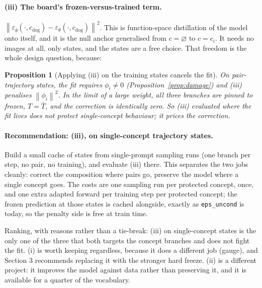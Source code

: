\documentclass[11pt]{article}
\newcommand{\eps}{\varepsilon}
\newcommand{\epsth}{\eps_\theta}
\newcommand{\epsfr}{\eps_{\bar\theta}}
\newcommand{\norm}[1]{\left\lVert #1 \right\rVert}
\newcommand{\cnull}{\varnothing}
\theoremstyle{plain}
\newtheorem{proposition}{Proposition}
\theoremstyle{remark}
\begin{document}
\paragraph{(iii) The board's frozen-versus-trained term.}
$\norm{\epsfr(\cdot,c_{\mathrm{dog}}) - \epsth(\cdot,c_{\mathrm{dog}})}^2$. This is function-space
distillation of the model onto itself, and it is the null anchor generalised from $c = \cnull$ to
$c = c_i$. It needs no images at all, only states, and the states are a free choice. That freedom is
the whole design question, because:

\begin{proposition}[Applying (iii) on the training states cancels the fit]
\label{prop:conflict}
On pair-trajectory states, the fit requires $\phi_i \neq 0$ (Proposition~\ref{prop:damage}) and
(iii) penalises $\norm{\phi_i}^2$. In the limit of a large weight, all three branches are pinned to
frozen, $T = \bar T$, and the correction is identically zero. So (iii) evaluated where the fit lives
does not protect single-concept behaviour; it prices the correction.
\end{proposition}

\paragraph{Recommendation: (iii), on single-concept trajectory states.}
Build a small cache of states from single-prompt sampling runs (one branch per step, no pair, no
training), and evaluate (iii) there. This separates the two jobs cleanly: correct the composition
where pairs go, preserve the model where a single concept goes. The costs are one sampling run per
protected concept, once, and one extra adapted forward per training step per protected concept; the
frozen prediction at those states is cached alongside, exactly as \texttt{eps\_uncond} is today, so
the penalty side is free at train time.

Ranking, with reasons rather than a tie-break: (iii) on single-concept states is the only one of the
three that both targets the concept branches and does not fight the fit. (i) is worth keeping
regardless, because it does a different job (gauge), and Section 3 recommends replacing it with the
stronger hard freeze. (ii) is a different project: it improves the model against data rather than
preserving it, and it is available for a quarter of the vocabulary.
\end{document}
